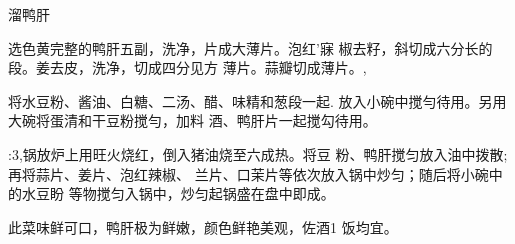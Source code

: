 \begin{recipe}{溜鸭肝}

\ingredients


\cooking

\step 选色黄完整的鸭肝五副，洗净，片成大薄片。泡红’寐 椒去籽，斜切成六分长的段。姜去皮，洗净，切成四分见方 薄片。蒜瓣切成薄片。,

\step 将水豆粉、酱油、白糖、二汤、醋、味精和葱段一起. 放入小碗中搅勻待用。另用大碗将蛋清和干豆粉搅勻，加料 酒、鸭肝片一起搅勾待用。

:3,锅放炉上用旺火烧红，倒入猪油烧至六成热。将豆 粉、鸭肝搅匀放入油中拨散;再将蒜片、姜片、泡红辣椒、 兰片、口茉片等依次放入锅中炒匀；随后将小碗中的水豆盼 等物搅匀入锅中，炒匀起锅盛在盘中即成。

\notes

此菜味鲜可口，鸭肝极为鲜嫩，颜色鲜艳美观，佐酒1 饭均宜。

\end{recipe}


